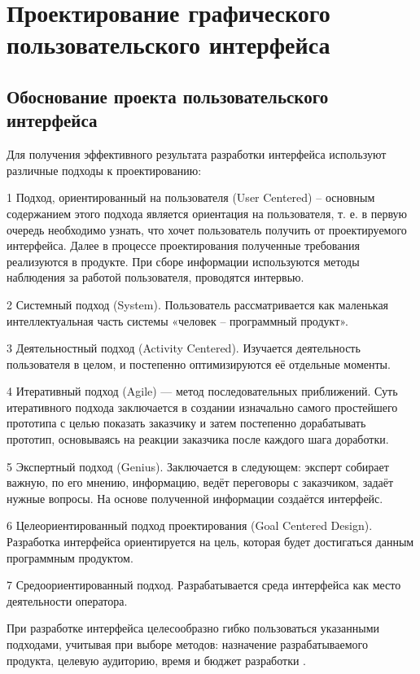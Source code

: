
\section{Проектирование графического пользовательского интерфейса} %
\label{sec:gui_design}


\subsection{Обоснование проекта пользовательского интерфейса}
\label{sub:gui_design:motivation}

Для получения эффективного результата разработки интерфейса используют различные подходы к проектированию:

1 Подход, ориентированный на пользователя (User Centered) -- основным содержанием этого подхода является ориентация на пользователя, т. е. в первую очередь необходимо узнать, что хочет пользователь получить от проектируемого интерфейса. Далее в процессе проектирования полученные требования реализуются в продукте. При сборе информации используются методы наблюдения за работой пользователя, проводятся интервью.

2 Системный подход (System). Пользователь рассматривается
как маленькая интеллектуальная часть системы «человек -- программный продукт».

3 Деятельностный подход (Activity Centered). Изучается деятельность пользователя в целом, и постепенно оптимизируются её отдельные моменты.

4 Итеративный подход (Agile) — метод последовательных приближений. Суть итеративного подхода заключается в создании изначально самого простейшего прототипа с целью показать заказчику и затем постепенно дорабатывать прототип, основываясь на реакции заказчика после каждого шага доработки.

5 Экспертный подход (Genius). Заключается в следующем: эксперт собирает важную, по его мнению, информацию, ведёт переговоры с заказчиком, задаёт нужные вопросы. На основе полученной информации создаётся интерфейс.

6 Целеориентированный подход проектирования (Goal Centered
Design). Разработка интерфейса ориентируется на цель, которая будет
достигаться данным программным продуктом.

7 Средоориентированный подход. Разрабатывается среда интерфейса как место деятельности оператора.

При разработке интерфейса целесообразно гибко пользоваться
указанными подходами, учитывая при выборе методов: назначение
разрабатываемого продукта, целевую аудиторию, время и бюджет разработки \cite{ergo}.


